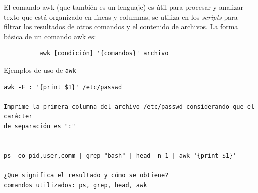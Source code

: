 \documentclass[12pt]{article}
\begin{document}
El comando awk (que también es un lenguaje) es útil para procesar y analizar texto que está organizado en líneas y columnas, se utiliza en los \textit{scripts} para filtrar los resultados de otros comandos y el contenido de archivos. La forma básica de un comando awk es: 

\begin{verbatim}
          awk [condición] '{comandos}' archivo
\end{verbatim}

Ejemplos de uso de \texttt{awk}

\begin{verbatim}
awk -F : '{print $1}' /etc/passwd

Imprime la primera columna del archivo /etc/passwd considerando que el carácter 
de separación es ":"


ps -eo pid,user,comm | grep "bash" | head -n 1 | awk '{print $1}'

¿Que significa el resultado y cómo se obtiene?
comandos utilizados: ps, grep, head, awk

\end{verbatim}
\end{document}
